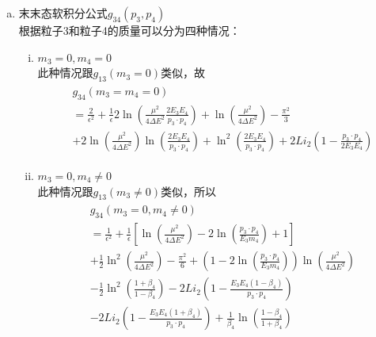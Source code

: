 \begin{enumerate}[(a)]
\item 末末态软积分公式$g_{34}(p_3,p_4)$ \\
根据粒子3和粒子4的质量可以分为四种情况：
\begin{enumerate}[(i)]
\item $m_3 = 0, m_4 = 0$\\
此种情况跟$g_{13}(m_3=0)$类似，故
\begin{eqnarray}
\begin{split}
& g_{34}(m_3 = m_4 = 0) \\ 
& = \frac{2}{\epsilon^2} + \frac{1}{\epsilon} 2\ln\left(\frac{\mu^2}{4\Delta E^2}
\frac{2E_3E_4}{p_3\cdot p_4}\right) + \ln\left(\frac{\mu^2}{4\Delta E^2}\right) - \frac{\pi^2}{3}
\\
& + 2\ln\left(\frac{\mu^2}{4\Delta E^2}\right)\ln\left(\frac{2E_3E_4}{p_3\cdot p_4}\right)
+ \ln^2\left(\frac{2E_3E_4}{p_3\cdot p_4}\right) + 2Li_2\left(1-\frac{p_3\cdot p_4}{2E_3E_4}\right)
\end{split}
\end{eqnarray}

\item $m_3 = 0, m_4\ne 0$ \\
此种情况跟$g_{13}(m_3\ne 0)$类似，所以
\begin{eqnarray}
\begin{split}
& g_{34}(m_3 = 0, m_4\ne 0) \\
& = \frac{1}{\epsilon^2} + \frac{1}{\epsilon}\left[\ln\left(\frac{\mu^2}{4\Delta E^2}\right)
-2\ln\left(\frac{p_3\cdot p_4}{E_3m_4}\right) + 1 \right] \\
& + \frac{1}{2} \ln^2\left(\frac{\mu^2}{4\Delta E^2}\right) - \frac{\pi^2}{6} + 
\left(1-2\ln\left(\frac{p_3\cdot p_4}{E_3m_4}\right)\right)\ln\left(\frac{\mu^2}{4\Delta E^2}\right)
\\
& -\frac{1}{2}\ln^2\left(\frac{1+\beta_4}{1-\beta_4} \right) - 
2Li_2\left(1-\frac{E_3E_4(1-\beta_4)}{p_3\cdot p_4}\right) \\
& - 2Li_2\left(1-\frac{E_3E_4(1+\beta_4)}{p_3\cdot p_4}\right) + 
\frac{1}{\beta_4} \ln\left(\frac{1-\beta_4}{1+\beta_4}\right)
\end{split}
\end{eqnarray}


\end{enumerate}
\end{enumerate}
